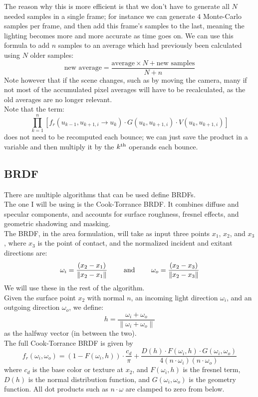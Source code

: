 \documentclass[12pt]{article}
\begin{document}
The reason why this is more efficient is that we 
don't have to generate all $N$ needed samples in a 
single frame; for instance we can generate $4$
Monte-Carlo samples per frame, and then add
this frame's samples to the last, meaning the lighting
becomes more and more accurate as time goes on.
We can use this formula to add $n$ samples to an average
which had previously been calculated using $N$
older samples:
\[ \text{new average} = 
\dfrac{\text{average} \times N + 
\text{new samples}}{N + n} \]
Note however that if the scene changes, such as by moving
the camera, many if not most of the accumulated
pixel averages will have to be recalculated,
as the old averages are no longer relevant. \\

Note that the term:
\[ \prod_{k=1}^{n} 
\left[ f_r(u_{k-1}, u_{k+1, i} \to u_k) \cdot 
G(u_k, u_{k+1, i}) \cdot V(u_k, u_{k+1, i}) \right] \]
does not need to be recomputed each bounce;
we can just save the product in a variable
and then multiply it by the $k^{\text{th}}$
operands each bounce. \\

\newpage

\subsection*{BRDF}

There are multiple algorithms that can be used define
BRDFs. \\
The one I will be using is the Cook-Torrance BRDF.
It combines diffuse and specular components, 
and accounts for surface roughness, 
fresnel effects, and geometric shadowing and masking. \\

The BRDF, in the area formulation, will take as input
three points $x_1$, $x_2$, and $x_3$,
where $x_3$ is the point of contact, and
the normalized incident and exitant directions are:
\[ \omega_i = \dfrac{(x_2 - x_1)}{\|x_2 - x_1\|} 
\qquad \text{ and } \qquad 
\omega_o = \dfrac{(x_2 - x_3)}{\|x_2 - x_3\|} \]
We will use these in the rest of the algorithm. \\

Given the surface point $x_2$ with normal $n$, 
an incoming light direction $\omega_i$, 
and an outgoing direction $\omega_o$, 
we define:
\[ h = \frac{\omega_i + \omega_o}
{\|\omega_i + \omega_o\|} \]
as the halfway vector (in between the two). \\

The full Cook-Torrance BRDF is given by
\[f_r(\omega_i, \omega_o) = (1 - F(\omega_i, h)) 
\cdot \frac{c_d}{\pi}
+ \frac{D(h) \cdot F(\omega_i, h) \cdot 
G(\omega_i, \omega_o)}{4 (n \cdot \omega_i)
(n \cdot \omega_o)} \]
where $c_d$ is the base color or texture at $x_2$, 
and $ F(\omega_i, h)$ is the fresnel term, 
$D(h)$ is the normal distribution function, 
and $ G(\omega_i, \omega_o) $ is the geometry function. 
All dot products such as $ n \cdot \omega $ 
are clamped to zero from below. \\
\end{document}
